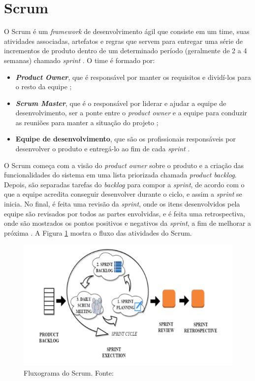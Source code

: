\section{Scrum}

O Scrum é um \textit{framework} de desenvolvimento ágil que consiste em um time, suas atividades associadas, artefatos e regras que servem para entregar uma série de incrementos de produto dentro de um determinado período (geralmente de 2 a 4 semanas) chamado \textit{sprint} \cite{livro-scrum}.
O time é formado por:
\begin{itemize}
\item \textbf{\textit{Product Owner}}, que é responsável por manter os requisitos e dividí-los para o resto da equipe \cite{product-owner};
\item \textbf{\textit{Scrum Master}}, que é o responsável por liderar e ajudar a equipe de desenvolvimento, ser a ponte entre o \textit{product owner} e a equipe para conduzir as reuniões para manter a situação do projeto \cite{scrum-master};
\item \textbf{Equipe de desenvolvimento}, que são os profissionais responsáveis por desenvolver o produto e entregá-lo ao fim de cada \textit{sprint} \cite{equipe-dev}.
\end{itemize}

O Scrum começa com a visão do \textit{product owner} sobre o produto e a criação das funcionalidades do sistema em uma lista priorizada chamada \textit{product backlog}. Depois, são separadas tarefas do \textit{backlog} para compor a \textit{sprint}, de acordo com o que a equipe acredita conseguir desenvolver durante o ciclo, e assim a \textit{sprint} se inicia. No final, é feita uma revisão da \textit{sprint}, onde os itens desenvolvidos pela equipe são revisados por todos as partes envolvidas, e é feita uma retrospectiva, onde são mostrados os pontos positivos e negativos da \textit{sprint}, a fim de melhorar a próxima \cite{livro-scrum}. A Figura \ref{img:scrum} mostra o fluxo das atividades do Scrum.

\begin{figure}[H]
    \centering
    \includegraphics[scale=0.5]{figuras/scrum.png}
    \caption[Fluxograma do Scrum]{Fluxograma do Scrum. Fonte: \cite{artigo-scrum}}
    \label{img:scrum}
\end{figure}

